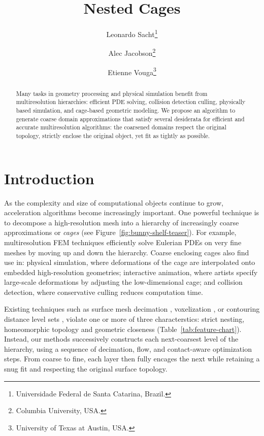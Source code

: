 \documentclass{cgyrf15}
\title{Nested Cages}
\author{
Leonardo Sacht\thanks{Universidade Federal de Santa Catarina, Brazil.} \and
Alec Jacobson\thanks{Columbia University, USA.} \and
Etienne Vouga\thanks{University of Texas at Austin, USA.} 
}
\begin{document}
\maketitle

\begin{abstract}
Many tasks in geometry processing and physical simulation benefit from
multiresolution hierarchies: efficient PDE solving, collision detection
culling, physically based simulation, and cage-based geometric modeling. We
propose an algorithm to generate coarse domain approximations that satisfy
several desiderata for efficient and accurate multiresolution algorithms: the
coarsened domains respect the original topology, strictly enclose the original
object, yet fit as tightly as possible.
\end{abstract}

\section{Introduction}

As the complexity and size of computational objects continue to grow,
acceleration algorithms become increasingly important. One powerful technique
is to decompose a high-resolution mesh into a hierarchy of increasingly coarse
approximations or \emph{cages} (see Figure~\ref{fig:bunny-shelf-teaser}). For example,
multiresolution FEM techniques efficiently solve Eulerian PDEs on very fine
meshes by moving up and down the hierarchy.  Coarse enclosing cages also find
use in: physical simulation, where deformations of the cage are interpolated
onto embedded high-resolution geometries; interactive animation, where
artists specify large-scale deformations by adjusting the low-dimensional cage;
and collision detection, where conservative culling reduces computation
time. 

Existing techniques such as surface mesh decimation \cite{Hoppe:1996:PM}, 
voxelization \cite{Xian:2009}, or
contouring distance level sets \cite{Shen:2004:IAI}, violate one or more of three characterstics:
strict nesting, homeomorphic topology and geometric closeness
(Table~\ref{tab:feature-chart}).  Instead, our methods successively constructs
each next-coarsest level of the hierarchy, using a sequence of decimation,
flow, and contact-aware optimization steps.  From coarse to fine, each layer
then fully encages the next while retaining a snug fit and respecting the
original surface topology.
\end{document}
